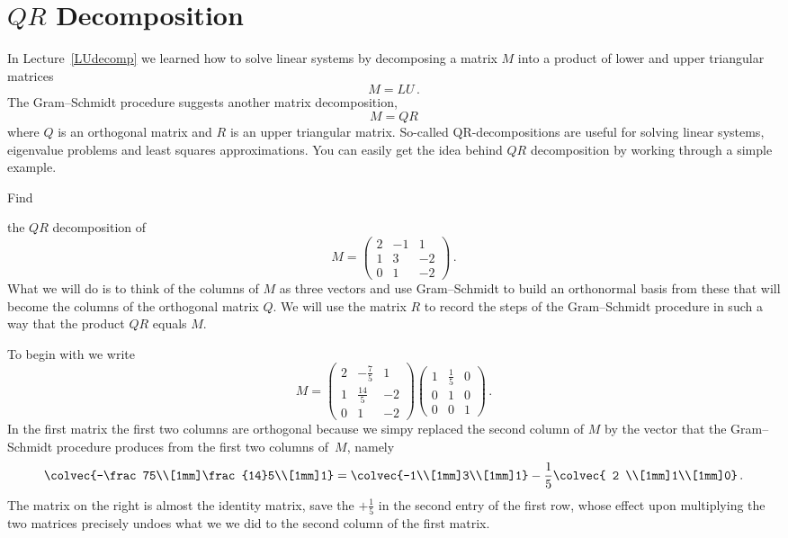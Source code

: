 \section{$QR$ Decomposition}
In Lecture~\ref{LUdecomp} we learned how to solve linear systems by decomposing a matrix $M$ into 
a product of lower and upper triangular matrices
\[M=LU\, .\]
The Gram--Schmidt procedure suggests another matrix decomposition,
\[M=QR\] 
where $Q$ is an orthogonal matrix and $R$ is an upper triangular matrix. So-called QR-decompositions
are useful for solving linear systems, eigenvalue problems and least squares approximations. You can
easily get the idea behind $QR$ decomposition by working through a simple example.

\begin{example}
\hypertarget{methodQR}{Find} the $QR$ decomposition of \[M=\begin{pmatrix}2&-1&1\\1&3&-2\\0&1&-2\end{pmatrix}\, .\]
What we will do is to think of the columns of $M$ as three vectors and use Gram--Schmidt to
build an orthonormal basis from these that will become the columns of the orthogonal matrix $Q$.
We will use the matrix $R$ to record the steps of the Gram--Schmidt procedure in such a way
that the product $QR$ equals $M$. 

To begin with we write
\[
M=\begin{pmatrix}2&-\frac75&1\\[1mm]1&\frac{14}5&-2\\[1mm]0&1&-2\end{pmatrix}
\begin{pmatrix}1&\frac15&0\\[1mm]0&1&0\\[1mm]0&0&1\end{pmatrix}\, .
\]
In the first matrix the first two columns are  orthogonal because we simpy replaced the second column of $M$ by the vector that the Gram--Schmidt
procedure produces from the first two columns of~$M$, namely
\[
\colvec{-\frac75\\[1mm]\frac{14}5\\[1mm]1}=\colvec{-1\\[1mm]3\\[1mm]1}-\frac15
\colvec{ 2 \\[1mm]1\\[1mm]0}\, .
\]
 The matrix on the right is almost the identity
matrix, save the $+\frac15$ in the second entry of the first row, whose effect upon multiplying the
two matrices precisely undoes what we we did to the second column of the first matrix. 


\end{example}
